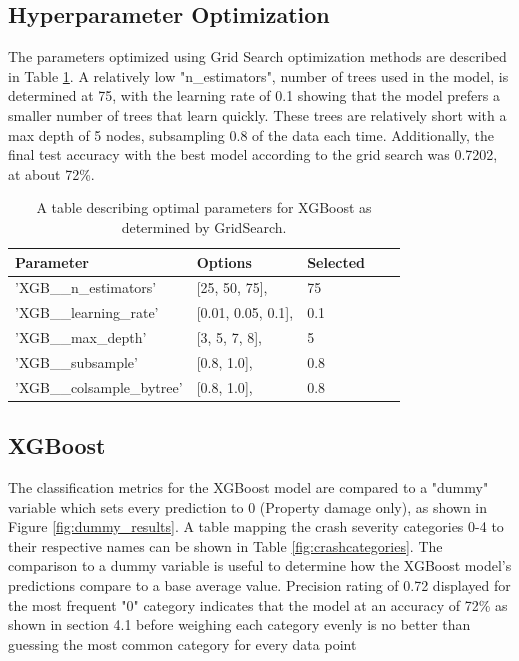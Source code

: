 \documentclass[12pt]{article}
\begin{document}
\subsection{Hyperparameter Optimization}
The parameters optimized using Grid Search optimization methods are described in Table \ref{fig:gridsearch}. A relatively
low "n\_estimators", number of trees used in the model, is determined at 75, with the learning rate of 0.1 showing
that the model prefers a smaller number of trees that learn quickly. These trees are relatively short with a max
depth of 5 nodes, subsampling 0.8 of the data each time. Additionally, the final test
accuracy with the best model according to the grid search was 0.7202, at about 72\%. 

\begin{table}[]
\begin{center}
\begin{tabular}{lllll}
\hline
Parameter & Options & Selected \\ \hline
'XGB\_\_n\_estimators' & {[}25, 50, 75{]},       & 75  \\
'XGB\_\_learning\_rate' & {[}0.01, 0.05, 0.1{]}, & 0.1 \\
'XGB\_\_max\_depth'& {[}3, 5, 7, 8{]},          & 5   \\
'XGB\_\_subsample'& {[}0.8, 1.0{]},             & 0.8 \\ 
'XGB\_\_colsample\_bytree' & {[}0.8, 1.0{]},     & 0.8 
\end{tabular}
  \caption{A table describing optimal parameters for XGBoost as determined by GridSearch.}
  \label{fig:gridsearch}
\end{center}
\end{table}

\subsection{XGBoost}
The classification metrics for the XGBoost model are compared to a "dummy" variable which sets every prediction to 0 (Property 
damage only), as shown in Figure \ref{fig:dummy_results}. A table mapping the crash severity categories 0-4 to their respective 
names can be shown in Table \ref{fig:crashcategories}.
The comparison to a dummy variable is useful to determine how the XGBoost model's predictions compare to a base average value.
Precision rating of 0.72 displayed for the most frequent "0" category indicates that the model at an accuracy of 72\% as shown
in section 4.1 before weighing each category evenly is no better than guessing the most common category for every data point
\end{document}

